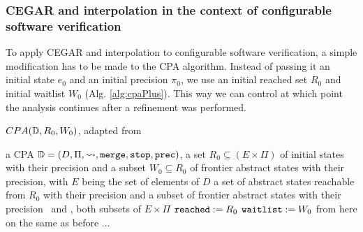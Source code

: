 \subsubsection{CEGAR and interpolation in the context of configurable software verification}
\label{sec:cegarBasics}
To apply CEGAR and interpolation to configurable software verification, a simple modification has to be made to the CPA algorithm.
Instead of passing it an initial state $e_0$ and an initial precision $\pi_0$, we use an initial reached set $R_0$ and initial waitlist $W_0$ (Alg. \ref{alg:cpaPlus}).
This way we can control at which point the analysis continues after a refinement was performed.

\begin{algorithm}[t]
\caption{$CPA(\mathbb{D}, R_0, W_0)$, adapted from \cite{Beyer2013}}
\label{alg:cpaPlus}
\begin{algorithmic}[1]

\Input a CPA $\mathbb{D} = (D, \Pi, \rightsquigarrow, \texttt{merge}, \texttt{stop}, \texttt{prec})$,
	    a set $R_0 \subseteq (E \times \Pi)$ of initial states with their precision and
	    a subset $W_0 \subseteq R_0$ of frontier abstract states with their precision,
	    with $E$ being the set of elements of $D$
\Output a set of abstract states reachable from $R_0$ with their precision and
	   a subset of frontier abstract states with their precision
\Variables \reachedSet\ and \waitlistSet , both subsets of $E \times \Pi$
\State $\texttt{reached} := R_0$
\State $\texttt{waitlist} := W_0$
\While{$\waitlistSet \neq \varnothing$} \Comment from here on the same as before
\State ...
\EndWhile
\end{algorithmic}
\end{algorithm}

